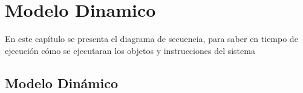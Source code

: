 \chapter{Modelo Dinamico}	
\label{cap:modeloDinamico}

	En este capítulo se presenta el diagrama de secuencia, para saber en tiempo de ejecución cómo se ejecutaran los objetos y instrucciones del sistema

\section{Modelo Dinámico}	



